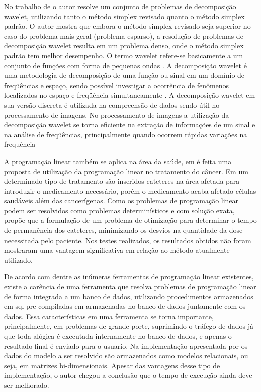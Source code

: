 No trabalho de  o autor resolve um conjunto de problemas de decomposição wavelet, utilizando tanto o método simplex revisado quanto o método simplex padrão. O autor mostra que embora o método simplex revisado seja superior no caso do problema mais geral (problema esparso), a resolução de problemas de decomposição wavelet resulta em um problema denso, onde o método simplex padrão tem melhor  desempenho.
O termo wavelet refere-se basicamente a um conjunto de funções com forma de pequenas ondas \cite{Ondaletas}. A decomposição wavelet é uma metodologia de decomposição de uma função ou sinal em um domínio de freqüências e espaço, sendo possível investigar a ocorrência de fenômenos localizados no espaço e freqüência simultaneamente \cite{Peixoto-wavelet}.
A decomposição wavelet em sua versão discreta é utilizada na compreensão de dados sendo útil no processamento de imagens. No processamento de imagens a utilização da decomposição wavelet se torna eficiente na extração de informações de um sinal e na análise de freqüências, principalmente quando ocorrem rápidas variações na frequência \cite{Leite-wavelet} 

A programação linear também se aplica na área da saúde, em  é feita uma proposta de utilização da programação linear no tratamento do câncer. 
Em um determinado tipo de tratamento são inseridos cateteres na área afetada para introduzir o medicamento necessário, porém o medicamento acaba afetado células saudáveis além das cancerígenas. Como os problemas de programação linear podem ser resolvidos como problemas determinísticos e com solução exata,  propõe que a formulação de um problema de otimização para determinar o tempo de permanência dos cateteres, minimizando os desvios na quantidade da dose necessitada pelo paciente. Nos testes realizados, os resultados obtidos não foram mostraram uma vantagem significativa em relação ao método atualmente utilizado.

De acordo com  dentre as inúmeras ferramentas de programação linear existentes, existe a carência de uma ferramenta que resolva problemas de programação linear de forma integrada a um banco de dados, utilizando procedimentos armazenados em sql pre compiladas em armazenadas no banco de dados juntamente com os dados. Essa características em uma ferramenta se torna importante, principalmente, em problemas de grande porte, suprimindo o tráfego de dados já que toda alógica é executada internamente no banco de dados, e apenas o resultado final é enviado para o usuario. Na implementação apresentada por  os dados do modelo a ser resolvido são armazenados como modelos relacionais, ou seja, em matrizes bi-dimensionais. Apesar das vantagens desse tipo de implementação, o autor chegou a conclusão que o tempo de execução ainda deve ser melhorado.

